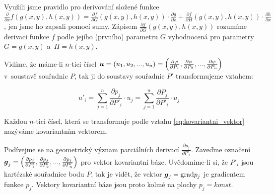 Využili jsme pravidlo pro derivování složené funkce \(\frac{\partial}{\partial x} f(g(x, y), h(x, y)) = \frac{\partial f}{\partial G}(g(x, y), h(x, y)) \cdot \frac{\partial g}{\partial x} + \frac{\partial f}{\partial H}(g(x, y), h(x, y)) \cdot \frac{\partial h}{\partial x}\), jen jsme ho zapsali pomocí sumy. Zápisem \(\frac{\partial f}{\partial G}(g(x, y), h(x, y))\) rozumíme derivaci funkce \(f\) podle jejího (prvního) parametru \(G\) vyhodnocená pro parametry \(G = g(x, y)\) a~\(H = h(x, y)\).

Vidíme, že máme-li \(n\)-tici čísel \(\boldsymbol{u} = (u_1, u_2, ..., u_n) = \left( \frac{\partial \varphi}{\partial P_1}, \frac{\partial \varphi}{\partial P_2}, ..., \frac{\partial \varphi}{\partial P_n} \right)\) v~soustavě souřadnic \(P\), tak ji do soustavy souřadnic \(P'\) transformujeme vztahem:

\begin{equation}
\label{eq:kovariantni_vektor}
u'_i = \sum_{j=1}^n \frac{\partial p_j}{\partial P'_i} \cdot u_j = \sum_{j=1}^n \frac{\partial P_j}{\partial P'_i} \cdot u_j
\end{equation}

Každou \(n\)-tici čísel, která se transformuje podle vztahu \eqref{eq:kovariantni_vektor} nazýváme kovariantním vektorem.

Podívejme se na geometrický význam parciálních derivací \(\frac{\partial p_j}{\partial P'_i}\). Zaveďme označení \(\boldsymbol{g}_j = \left(\frac{\partial p_j}{\partial P'_1}, \frac{\partial p_j}{\partial P'_2}, ..., \frac{\partial p_j}{\partial P'_n}\right)\) pro vektor kovariantní báze. Uvědomíme-li si, že \(P'_i\) jsou kartézské souřadnice bodu \(P\), tak je vidět, že vektor \(\boldsymbol{g}_j = \mathrm{grad} p_j\) je gradientem funkce \(p_j\). Vektory kovariantní báze jsou proto kolmé na plochy \(p_j = konst\).

 

